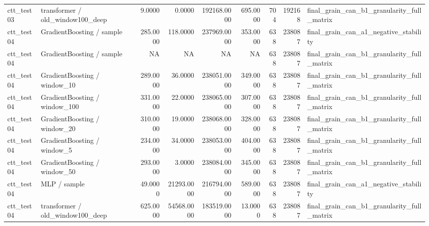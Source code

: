 \begin{tabular}{llrrrrrrl}
ctt\_test03 & transformer / old\_window100\_deep & 9.0000 & 0.0000 & 192168.0000 & 695.0000 & 704 & 192168 & final\_grain\_can\_b1\_granularity\_full\_matrix \\
ctt\_test04 & GradientBoosting / sample & 285.0000 & 118.0000 & 237969.0000 & 353.0000 & 638 & 238087 & final\_grain\_can\_a1\_negative\_stability \\
ctt\_test04 & GradientBoosting / sample & NA & NA & NA & NA & 638 & 238087 & final\_grain\_can\_b1\_granularity\_full\_matrix \\
ctt\_test04 & GradientBoosting / window\_10 & 289.0000 & 36.0000 & 238051.0000 & 349.0000 & 638 & 238087 & final\_grain\_can\_b1\_granularity\_full\_matrix \\
ctt\_test04 & GradientBoosting / window\_100 & 331.0000 & 22.0000 & 238065.0000 & 307.0000 & 638 & 238087 & final\_grain\_can\_b1\_granularity\_full\_matrix \\
ctt\_test04 & GradientBoosting / window\_20 & 310.0000 & 19.0000 & 238068.0000 & 328.0000 & 638 & 238087 & final\_grain\_can\_b1\_granularity\_full\_matrix \\
ctt\_test04 & GradientBoosting / window\_5 & 234.0000 & 34.0000 & 238053.0000 & 404.0000 & 638 & 238087 & final\_grain\_can\_b1\_granularity\_full\_matrix \\
ctt\_test04 & GradientBoosting / window\_50 & 293.0000 & 3.0000 & 238084.0000 & 345.0000 & 638 & 238087 & final\_grain\_can\_b1\_granularity\_full\_matrix \\
ctt\_test04 & MLP / sample & 49.0000 & 21293.0000 & 216794.0000 & 589.0000 & 638 & 238087 & final\_grain\_can\_a1\_negative\_stability \\
ctt\_test04 & transformer / old\_window100\_deep & 625.0000 & 54568.0000 & 183519.0000 & 13.0000 & 638 & 238087 & final\_grain\_can\_b1\_granularity\_full\_matrix \\
\bottomrule
\end{tabular}
